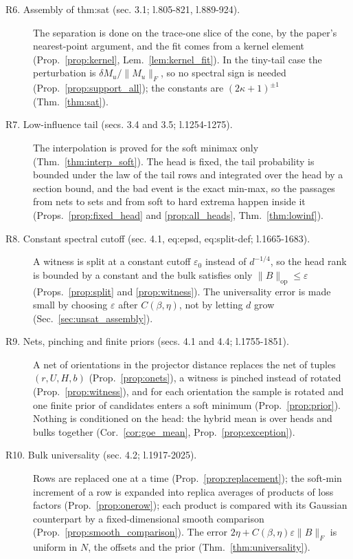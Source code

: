 \documentclass[11pt]{article}
\newcommand{\norm}[1]{\lVert #1\rVert}
\newcommand{\op}{\mathrm{op}}
\newcommand{\Fro}{F}
\theoremstyle{plain}
\theoremstyle{definition}
\begin{document}
\begin{description}
\item[R6. Assembly of thm:sat (sec. 3.1; l.805-821, l.889-924).] The separation is done on the trace-one slice of the cone, by the paper's nearest-point argument, and the fit comes from a kernel element (Prop.~\ref{prop:kernel}, Lem.~\ref{lem:kernel_fit}). In the tiny-tail case the perturbation is $\delta M_u/\norm{M_u}_\Fro$, so no spectral sign is needed (Prop.~\ref{prop:support_all}); the constants are $(2\kappa+1)^{\pm1}$ (Thm.~\ref{thm:sat}).
\item[R7. Low-influence tail (secs. 3.4 and 3.5; l.1254-1275).] The interpolation is proved for the soft minimax only (Thm.~\ref{thm:interp_soft}). The head is fixed, the tail probability is bounded under the law of the tail rows and integrated over the head by a section bound, and the bad event is the exact min-max, so the passages from nets to sets and from soft to hard extrema happen inside it (Props.~\ref{prop:fixed_head} and \ref{prop:all_heads}, Thm.~\ref{thm:lowinf}).
\item[R8. Constant spectral cutoff (sec. 4.1, eq:epsd, eq:split-def; l.1665-1683).] A witness is split at a constant cutoff $\varepsilon_0$ instead of $d^{-1/4}$, so the head rank is bounded by a constant and the bulk satisfies only $\norm{B}_\op \le \varepsilon$ (Props.~\ref{prop:split} and \ref{prop:witness}). The universality error is made small by choosing $\varepsilon$ after $C(\beta,\eta)$, not by letting $d$ grow (Sec.~\ref{sec:unsat_assembly}).
\item[R9. Nets, pinching and finite priors (secs. 4.1 and 4.4; l.1755-1851).] A net of orientations in the projector distance replaces the net of tuples $(r, U, H, b)$ (Prop.~\ref{prop:onets}), a witness is pinched instead of rotated (Prop.~\ref{prop:witness}), and for each orientation the sample is rotated and one finite prior of candidates enters a soft minimum (Prop.~\ref{prop:prior}). Nothing is conditioned on the head: the hybrid mean is over heads and bulks together (Cor.~\ref{cor:goe_mean}, Prop.~\ref{prop:exception}).
\item[R10. Bulk universality (sec. 4.2; l.1917-2025).] Rows are replaced one at a time (Prop.~\ref{prop:replacement}); the soft-min increment of a row is expanded into replica averages of products of loss factors (Prop.~\ref{prop:onerow}); each product is compared with its Gaussian counterpart by a fixed-dimensional smooth comparison (Prop.~\ref{prop:smooth_comparison}). The error $2\eta + C(\beta,\eta)\varepsilon\norm{B}_\Fro$ is uniform in $N$, the offsets and the prior (Thm.~\ref{thm:universality}).

\end{description}
\end{document}
